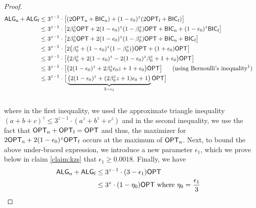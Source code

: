 \documentclass[11pt]{article}
\newcommand{\opt}{\ensuremath{\textsf{OPT}}}
\newcommand{\an}{\textsf{ALG}_{\textnormal{n}}\xspace}
\newcommand{\af}{\textsf{ALG}_{\textnormal{f}}\xspace}
\newcommand{\on}{\textsf{OPT}_{\textnormal{n}}\xspace}
\newcommand{\of}{\textsf{OPT}_{\textnormal{f}}\xspace}
\newcommand{\bicf}{\textsf{BIC}_{\textnormal{f}}\xspace}
\newcommand{\bicn}{\textsf{BIC}_{\textnormal{n}}\xspace}
\begin{document}
\begin{proof}
\begin{align*}
       \an+\af & \leq 3^{z-1} \cdot \big[ (2\on + \bicn)+(1 - \epsilon_0)^z(2\of + \bicf) \big]\\
     & \leq 3^{z-1} \cdot \big[ 2\beta_0^z \opt + 2 (1 - \epsilon_0)^z (1 - \beta_0^z) \opt + \bicn + (1 - \epsilon_0)^z \bicf \big]\\
     &\leq 3^{z-1} \cdot \big[ 2\beta_0^z \opt + 2 (1 - \epsilon_0)^z (1 - \beta_0^z) \opt + \bicn + \bicf  \big] \\ 
      & \leq 3^{z-1} \cdot \big[ 2\big( \beta_0^z  +  (1 - \epsilon_0)^z (1 - \beta_0^z) \big) \opt+  (1 + \epsilon_0) \opt \big]\\
       &\leq 3^{z-1} \cdot \big[\big( 2\beta_0^z  +  2(1 - \epsilon_0)^z -2(1-\epsilon_0)^z \beta_0^z +1 + \epsilon_0 \big)\opt \big]\\
         &\leq 3^{z-1} \cdot \big[\big( 2(1 - \epsilon_0)^z +2 \beta_0^z \epsilon_0 z +1 + \epsilon_0 \big)\opt \big]           \ \ \  \ \ \text{(using Bernoulli's  inequality\footnotemark )}\\
          &\leq 3^{z-1} \cdot \big[\underbrace{\big( 2(1 - \epsilon_0)^z +(2 \beta_0^z z +1) \epsilon_0+1 \big)}_{3 - \epsilon_1}\opt \big]\\
 &
\end{align*}
where in the first inequality, we used the approximate triangle inequality %
$(a + b + c)^z \leq 3^{z-1} \cdot (a^z + b^z + c^z)$ and in the second inequality, we use the fact that $\on + \of = \opt$ and thus, the maximizer for $2\on + 2(1 - \epsilon_0)^z \of$ occurs at the maximum of $\on$.
Next, to bound the above under-braced expression, we introduce a new parameter $\epsilon_1$, 
which we prove below in claim \ref{claim:kzs} that $\epsilon_1\geq 0.0018$. Finally, we have
\begin{align*}
    \an+\af &\leq 3^{z-1} \cdot (3-\epsilon_1)\opt  
           \\
          &\leq3^z \cdot (1 - \eta_0) \opt \ \text{where}\ \eta_0= \frac{\epsilon_1}{3}
          \\
\end{align*}


\end{proof}
\end{document}
